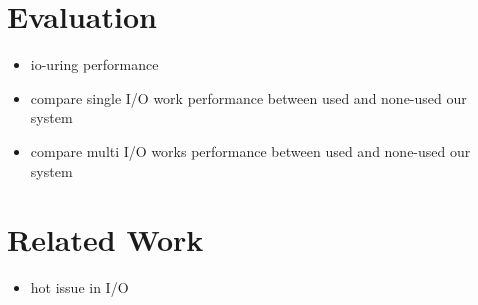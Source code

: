 \documentclass[conference]{IEEEtran}
\begin{document}




\section{Evaluation}
\begin{itemize}
    \item io-uring performance
    \item compare single I/O work performance between used and none-used our system 
    \item compare multi I/O works performance between used and none-used our system 
\end{itemize}

\section{Related Work}
\begin{itemize}
    \item hot issue in I/O
\end{itemize}
\end{document}
